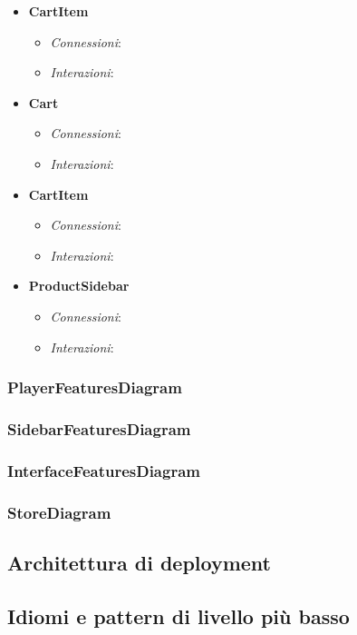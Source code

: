 \begin{itemize}
		\item \textbf{CartItem}
		\begin{itemize}
			\item \textit{Connessioni}:
			\item \textit{Interazioni}:
		\end{itemize} 
		\item \textbf{Cart}
		\begin{itemize}
			\item \textit{Connessioni}:
			\item \textit{Interazioni}:
		\end{itemize} 
		\item \textbf{CartItem}
		\begin{itemize}
			\item \textit{Connessioni}:
			\item \textit{Interazioni}:
		\end{itemize} 
		\item \textbf{ProductSidebar}
		\begin{itemize}
			\item \textit{Connessioni}:
			\item \textit{Interazioni}:
		\end{itemize} 
	\end{itemize}
	


\subsubsection{PlayerFeaturesDiagram}


\subsubsection{SidebarFeaturesDiagram}


\subsubsection{InterfaceFeaturesDiagram}


\subsubsection{StoreDiagram}


\subsection{Architettura di deployment}
\subsection{Idiomi e pattern di livello più basso}
